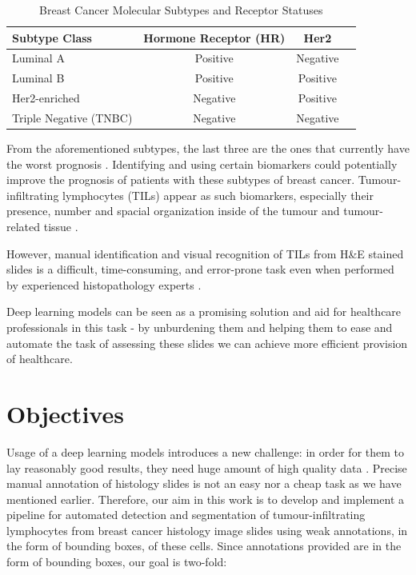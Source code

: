 \begin{table}[H]
    \centering
    \caption{Breast Cancer Molecular Subtypes and Receptor Statuses}
    \label{tab:breast_cancer_subtypes}
    \begin{tabular}{|l|c|c|c|}
        \hline
        \textbf{Subtype Class} & \textbf{Hormone Receptor (HR)} & \textbf{Her2} \\
        \hline
        Luminal A & Positive & Negative \\
        \hline
        Luminal B & Positive & Positive \\
        \hline
        Her2-enriched & Negative & Positive \\
        \hline
        Triple Negative (TNBC) & Negative & Negative \\
        \hline
    \end{tabular}
\end{table}

From the aforementioned subtypes, the last three are the ones that currently have the worst prognosis \cite{Schalper2022, Zhang2024}. Identifying and using certain biomarkers could potentially improve the prognosis of patients with these subtypes of breast cancer. Tumour-infiltrating lymphocytes (TILs) appear as such biomarkers, especially their presence, number and spacial organization inside of the tumour and tumour-related tissue \cite{Salgado2015, Denkert2018, Amgad2019}.

However, manual identification and visual recognition of TILs from H\&E stained slides is a difficult, time-consuming, and error-prone task even when performed by experienced histopathology experts \cite{Salgado2015, Amgad2019}.

Deep learning models can be seen as a promising solution and aid for healthcare professionals in this task - by unburdening them and helping them to ease and automate the task of assessing these slides we can achieve more efficient provision of healthcare.

\section{Objectives}
Usage of a deep learning models introduces a new challenge: in order for them to lay reasonably good results, they need huge amount of high quality data \cite{Santosh2022-3}. Precise manual annotation of histology slides is not an easy nor a cheap task as we have mentioned earlier. Therefore, our aim in this work is to develop and implement a pipeline for automated detection and segmentation of tumour-infiltrating lymphocytes from breast cancer histology image slides using weak annotations, in the form of bounding boxes, of these cells. Since annotations provided are in the form of bounding boxes, our goal is two-fold:

